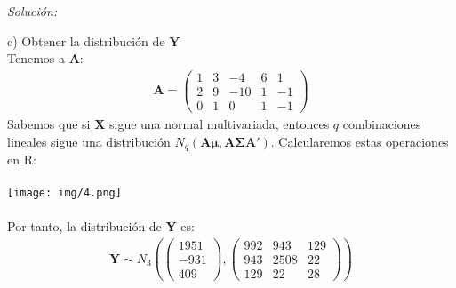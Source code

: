 \documentclass[12pt]{article}
\newenvironment{sol}
    {\emph{Solución:}
    }
    {
    }
\begin{document}
\begin{sol}
c) Obtener la distribución de $\mathbf{Y}$\\
Tenemos a $\mathbf{A}$:
\begin{align*} \mathbf{A} =
\begin{pmatrix}
1 & 3 & -4 & 6 & 1 \\
2 & 9 & -10 & 1 & -1\\
0 & 1 & 0 & 1 & -1 
\end{pmatrix}
\end{align*}
Sabemos que si $\mathbf{X}$ sigue una normal multivariada, entonces  $q$ combinaciones lineales sigue una distribución $N_q(\mathbf{A \mu , A \Sigma A'})$. Calcularemos estas operaciones en R:\\\\
\texttt{[image: img/4.png]}\\\\
Por tanto, la distribución de $\mathbf{Y}$ es:
\begin{align*}
\mathbf{Y}\sim N_3(\begin{pmatrix}
1951 \\ -931 \\ 409
\end{pmatrix}, 
\begin{pmatrix}
992 & 943 & 129 \\
943 & 2508 & 22 \\
129 & 22 & 28
\end{pmatrix})
\end{align*}


\end{sol}
\end{document}
